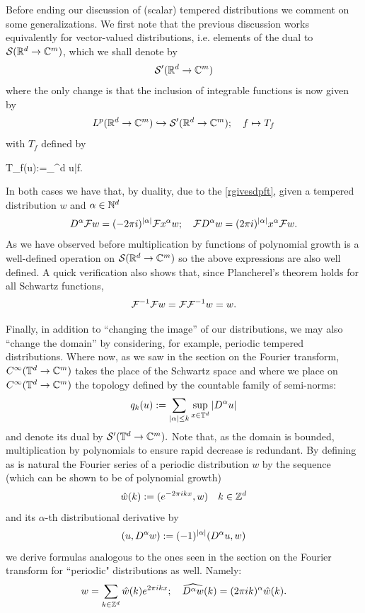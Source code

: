 \documentclass[
    a4paper,
    DIV=14,
    abstract=true,
    numbers=noenddot
]{scrartcl}
\begin{document}
Before ending our discussion of (scalar) tempered distributions we comment on some generalizations. We first note that the previous discussion works equivalently for vector-valued distributions, i.e. elements of the dual to $\mathcal{S}(\mathbb{R}^d\to\mathbb{C}^m)$, which we shall denote by\[\mathcal{S}'(\mathbb{R}^d\to\mathbb{C}^m)\]
where the only change is that the inclusion of integrable functions is now given by
\begin{align}\label{lpisvectordistr}
	L^p(\mathbb{R}^d\to\mathbb{C}^m)\hookrightarrow\mathcal{S}'(\mathbb{R}^d\to\mathbb{C}^m);\quad f\mapsto T_f
\end{align}
with $T_f$ defined by 
\begin{aligneq}\label{identificationfuncdist}
	T_f(u):=\int_{\R^d} u\cdot \bar{f}\quad{}.
\end{aligneq}
In both cases we have that, by duality, due to the \eqref{rgivesdpft}, given a tempered distribution $w$ and $\alpha\in \mathbb{N}^d$
\begin{align}\label{derivativedistronperiodic}
	D^\alpha\mathcal{F} w =(-2\pi i)^{{\left| \alpha \right|}}\mathcal{F} x^\alpha w;\quad
	\mathcal{F} D^{\alpha} w= (2\pi i)^{{\left| \alpha \right|}}x^\alpha\mathcal{F} w.
\end{align}
As we have observed before multiplication by functions of polynomial growth is a well-defined operation on $\mathcal{S}(\mathbb{R}^d\to\mathbb{C}^m)$ so the above expressions are also well defined. A quick verification also shows that, since Plancherel's theorem holds for all Schwartz functions,
\begin{equation}\label{planchereldistr}
	\mathcal{F}^{-1}\mathcal{F} w=\mathcal{F}\mathcal{F}^{-1}w=w.
\end{equation}

Finally, in addition to ``changing the image'' of our distributions, we may also ``change the domain'' by considering, for example, periodic tempered distributions. Where now, as we saw in the section on the Fourier transform, $C^\infty(\mathbb{T}^d\to\mathbb{C}^m)$ takes the place of the Schwartz space and where we place on $C^\infty(\mathbb{T}^d\to\mathbb{C}^m)$ the topology defined by the countable family of semi-norms:
\[q_k(u):=\sum_{{\left| \alpha \right|}\leq k}\sup_{x\in\mathbb{T}^d}{\left| D^\alpha u \right|}\]
and denote its dual by $\mathcal{S}'(\mathbb{T}^d\to\mathbb{C}^m).$ Note that, as the domain is bounded, multiplication by polynomials to ensure rapid decrease is redundant.
By defining as is natural the Fourier series of a periodic distribution $w$ by the sequence (which can be shown to be of polynomial growth)
\begin{equation}\label{fouriercoeffperiodicdist}
	\hat{w}(k):=(e^{-2\pi ikx},w)\quad k\in\mathbb{Z}^d
\end{equation}
and its $\alpha$-th distributional derivative by
\[(u,D^\alpha w):=(-1)^{\left| \alpha \right|}(D^\alpha u,w)\]
we derive formulas analogous to the ones seen in the section on the Fourier transform for ``periodic" distributions as well. Namely:
\begin{equation}\label{derivativedistr}
	w=\sum_{k\in\mathbb{Z}^d}\hat{w}(k)e^{2\pi i k x};\quad\widehat{D^\alpha w}(k)=(2\pi ik)^\alpha\hat{w}(k).
\end{equation}
\end{document}
